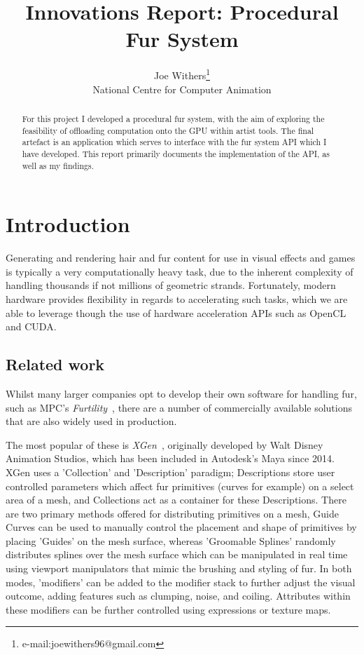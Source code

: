 \documentclass[]{acmsiggraph}
\title{Innovations Report: Procedural Fur System}
\author{Joe Withers\thanks{e-mail:joewithers96@gmail.com}\\National Centre for Computer Animation}
\begin{document}
\maketitle

\begin{abstract}
For this project I developed a procedural fur system, with the aim of exploring the feasibility of offloading computation onto the GPU within artist tools. The final artefact is an application which serves to interface with the fur system API which I have developed. This report primarily documents the implementation of the API, as well as my findings.
\end{abstract}

\section{Introduction} \label{sec:introduction}
Generating and rendering hair and fur content for use in visual effects and games is typically a very computationally heavy task, due to the inherent complexity of handling thousands if not millions of geometric strands. Fortunately, modern hardware provides flexibility in regards to accelerating such tasks, which we are able to leverage though the use of hardware acceleration APIs such as OpenCL and CUDA.

\subsection{Related work} \label{sec:related}
Whilst many larger companies opt to develop their own software for handling fur, such as MPC's \textit{Furtility}~\cite{furtility}, there are a number of commercially available solutions that are also widely used in production.

The most popular of these is \textit{XGen}~\cite{xgen}, originally developed by Walt Disney Animation Studios, which has been included in Autodesk's Maya since 2014. XGen uses a 'Collection' and 'Description' paradigm; Descriptions store user controlled parameters which affect fur primitives (curves for example) on a select area of a mesh, and Collections act as a container for these Descriptions. There are two primary methods offered for distributing primitives on a mesh, Guide Curves can be used to manually control the placement and shape of primitives by placing 'Guides' on the mesh surface, whereas 'Groomable Splines' randomly distributes splines over the mesh surface which can be manipulated in real time using viewport manipulators that mimic the brushing and styling of fur. In both modes, 'modifiers' can be added to the modifier stack to further adjust the visual outcome, adding features such as clumping, noise, and coiling. Attributes within these modifiers can be further controlled using expressions or texture maps.
\end{document}
